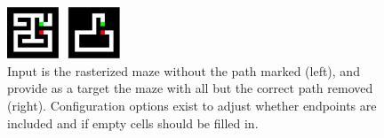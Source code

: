 \begin{figure}
	\hypertarget{fig:e2h-raster}{%
	\centering
	\includegraphics[width=0.3\textwidth]{figures/maze-raster-input-target.pdf}
	\caption{Input is the rasterized maze without the path marked (left),
	and provide as a target the maze with all but the correct path removed
	(right). Configuration options exist to adjust whether endpoints are
	included and if empty cells should be filled in.}\label{fig:e2h-raster}
	}
\end{figure}